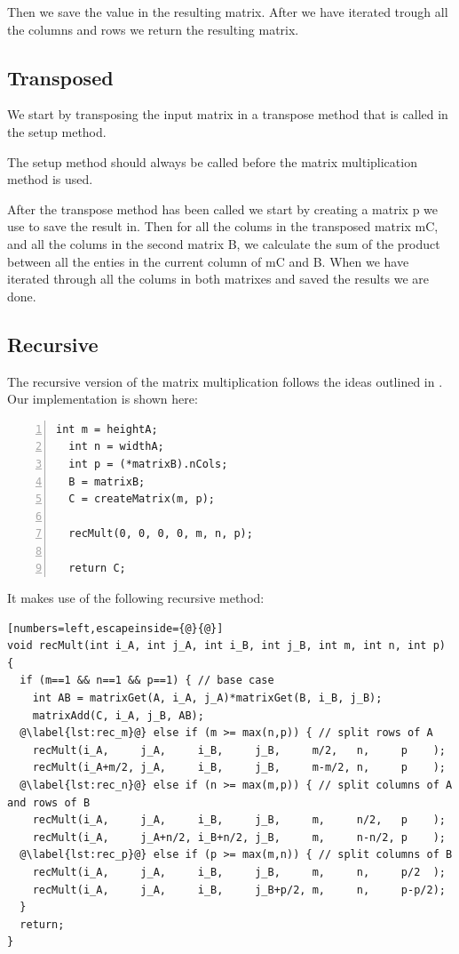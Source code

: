 Then we save the value in the resulting matrix.
After we have iterated trough all the columns and rows we return the resulting matrix.


\subsection{Transposed}

We start by transposing the input matrix in a transpose method that is called in the setup method.

The setup method should always be called before the matrix multiplication method is used.

After the transpose method has been called we start by creating a matrix p we use to save the result in.
Then for all the colums in the transposed matrix mC, and all the colums in the second matrix B, we calculate the sum of the product between all the enties in the current column of mC and B.
When we have iterated through all the colums in both matrixes and saved the results we are done.



\subsection{Recursive}
The recursive version of the matrix multiplication follows the ideas outlined in \citep{matrixMultiplication}.
Our implementation is shown here:
\begin{lstlisting}[numbers=left]
  int m = heightA;
  int n = widthA;
  int p = (*matrixB).nCols;
  B = matrixB;
  C = createMatrix(m, p);
  
  recMult(0, 0, 0, 0, m, n, p);
  
  return C;
\end{lstlisting}

It makes use of the following recursive method:
\begin{lstlisting}[numbers=left,escapeinside={@}{@}]
void recMult(int i_A, int j_A, int i_B, int j_B, int m, int n, int p) {
  if (m==1 && n==1 && p==1) { // base case
    int AB = matrixGet(A, i_A, j_A)*matrixGet(B, i_B, j_B);
    matrixAdd(C, i_A, j_B, AB);
  @\label{lst:rec_m}@} else if (m >= max(n,p)) { // split rows of A
    recMult(i_A,     j_A,     i_B,     j_B,     m/2,   n,     p    );
    recMult(i_A+m/2, j_A,     i_B,     j_B,     m-m/2, n,     p    );
  @\label{lst:rec_n}@} else if (n >= max(m,p)) { // split columns of A and rows of B
    recMult(i_A,     j_A,     i_B,     j_B,     m,     n/2,   p    );
    recMult(i_A,     j_A+n/2, i_B+n/2, j_B,     m,     n-n/2, p    );
  @\label{lst:rec_p}@} else if (p >= max(m,n)) { // split columns of B
    recMult(i_A,     j_A,     i_B,     j_B,     m,     n,     p/2  );
    recMult(i_A,     j_A,     i_B,     j_B+p/2, m,     n,     p-p/2);
  }
  return;
}
\end{lstlisting}

